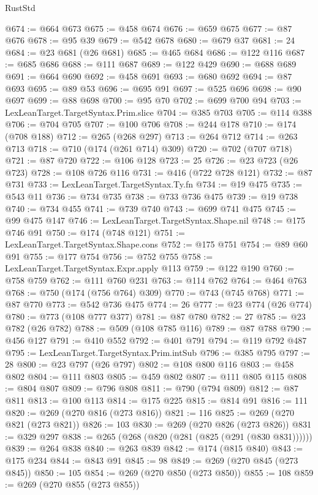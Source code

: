 \begin{lexlean}{RustStd}
\begin{coremodule}
@674 := @664 @673
@675 := @458 @674
@676 := @659 @675
@677 := @87 @676
@678 := @95 @39
@679 := @542 @678
@680 := @679 @37
@681 := 24
@684 := @23 @681 (@26 @681)
@685 := @465 @684
@686 := @122 @116
@687 := @685 @686
@688 := @111 @687
@689 := @122 @429
@690 := @688 @689
@691 := @664 @690
@692 := @458 @691
@693 := @680 @692
@694 := @87 @693
@695 := @89 @53
@696 := @695 @91
@697 := @525 @696
@698 := @90 @697
@699 := @88 @698
@700 := @95 @70
@702 := @699 @700 @94
@703 := LexLeanTarget.TargetSyntax.Prim.slice
@704 := @385 @703
@705 := @114 @388
@706 := @704 @705
@707 := @100 @706
@708 := @244 @178
@710 := @174 (@708 @188)
@712 := @265 (@268 @297)
@713 := @264 @712
@714 := @263 @713
@718 := @710 (@174 (@261 @714) @309)
@720 := @702 (@707 @718)
@721 := @87 @720
@722 := @106 @128
@723 := 25
@726 := @23 @723 (@26 @723)
@728 := @108 @726 @116
@731 := @416 (@722 @728 @121)
@732 := @87 @731
@733 := LexLeanTarget.TargetSyntax.Ty.fn
@734 := @19 @475
@735 := @543 @11
@736 := @734 @735
@738 := @733 @736 @475
@739 := @19 @738
@740 := @734 @455
@741 := @739 @740
@743 := @699 @741 @475
@745 := @99 @475 @147
@746 := LexLeanTarget.TargetSyntax.Shape.nil
@748 := @175 @746 @91
@750 := @174 (@748 @121)
@751 := LexLeanTarget.TargetSyntax.Shape.cons
@752 := @175 @751
@754 := @89 @60 @91
@755 := @177 @754
@756 := @752 @755
@758 := LexLeanTarget.TargetSyntax.Expr.apply @113
@759 := @122 @190
@760 := @758 @759
@762 := @111 @760 @231
@763 := @114 @762
@764 := @464 @763
@768 := @750 (@174 (@756 @764) @309)
@770 := @743 (@745 @768)
@771 := @87 @770
@773 := @542 @736 @475
@774 := 26
@777 := @23 @774 (@26 @774)
@780 := @773 (@108 @777 @377)
@781 := @87 @780
@782 := 27
@785 := @23 @782 (@26 @782)
@788 := @509 (@108 @785 @116)
@789 := @87 @788
@790 := @456 @127
@791 := @410 @552
@792 := @401 @791
@794 := @119 @792 @487
@795 := LexLeanTarget.TargetSyntax.Prim.intSub
@796 := @385 @795
@797 := 28
@800 := @23 @797 (@26 @797)
@802 := @108 @800 @116
@803 := @458 @802
@804 := @111 @803
@805 := @459 @802
@807 := @111 @805 @115
@808 := @804 @807
@809 := @796 @808
@811 := @790 (@794 @809)
@812 := @87 @811
@813 := @100 @113
@814 := @175 @225
@815 := @814 @91
@816 := 111
@820 := @269 (@270 @816 (@273 @816))
@821 := 116
@825 := @269 (@270 @821 (@273 @821))
@826 := 103
@830 := @269 (@270 @826 (@273 @826))
@831 := @329 @297
@838 := @265 (@268 (@820 (@281 (@825 (@291 (@830 @831))))))
@839 := @264 @838
@840 := @263 @839
@842 := @174 (@815 @840)
@843 := @175 @234
@844 := @843 @91
@845 := 98
@849 := @269 (@270 @845 (@273 @845))
@850 := 105
@854 := @269 (@270 @850 (@273 @850))
@855 := 108
@859 := @269 (@270 @855 (@273 @855))

\end{coremodule}
\end{lexlean}
